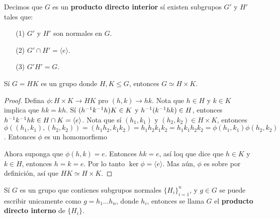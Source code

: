 \begin{definition}
    Decimos que $G$ es un  \textbf{producto directo interior} s\'i existen
    subgrupos $G'$ y  $H'$ tales que:
    \begin{enumerate}
        \item[(1)] $G'$ y  $H'$ son normales en  $G$.

        \item[(2)] $G' \cap H'=\langle e \rangle$.

        \item[(3)] $G'H'=G$.
    \end{enumerate}
\end{definition}

\begin{theorem}\label{thm_6.21}
    S\'i $G=HK$ es un grupo donde  $H,K \leq G$, entonces  $G \simeq H \times
    K$.
\end{theorem}
\begin{proof}
    Defina $\phi:H \times K \xrightarrow{} HK$ pro $(h,k) \xrightarrow{} hk$.
    Nota que $h \in H$ y  $k \in K$ implica que  $hk=kh$. S\'i
    $(h^{-1}k^{-1}h)K \in K$ y $h^{-1}(k^{-1}hk) \in H$, entonces
    $h^{-1}k^{-1}hk \in H \cap K=\langle e \rangle$. Nota que s\'i $(h_1,k_1)$
    y $(h_2,k_2) \in H \times K$, entonces
    $\phi((h_1,k_1),(h_2,k_2))=(h_1h_2,k_1k_2)=h_1h_2k_1k_2=h_1k_1h_2k_2=\phi(h_1,
    k_1)\phi(h_2,k_2)$. Entonces $\phi$ es un homomorfismo

    Ahora suponga que $\phi(h,k)=e$. Entonces $hk=e$, as\'i loq que dice que  $h
    \in K$ y  $k \in H$, entonces  $h=k=e$. Por lo tanto  $\ker{\phi}=\langle e
    \rangle$. Mas a\'un, $\phi$ es sobre por definici\'on, as\'i que  $HK \simeq
    H \times K$.
\end{proof}

\begin{definition}
    S\'i $G$ es un grupo que contienes subgrupos normales  $\{H_i\}_{i=1}^n$,
    y $g \in G$ se puede escribir unicamente como  $g=h_1 \dots h_n$, donde
    $h_i$, entonces se llama $G$ el  \textbf{producto directo interno} de
    $\{H_i\}$.
\end{definition}

